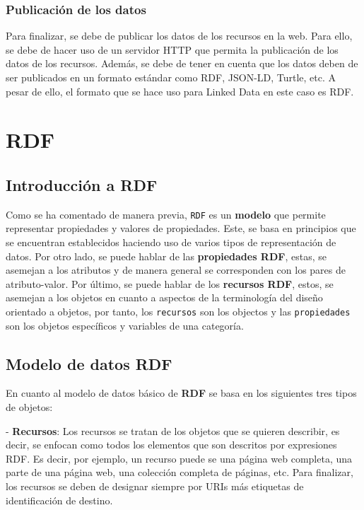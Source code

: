 \documentclass[11pt]{report}
\begin{document}
\subsection{Publicación de los datos}

Para finalizar, se debe de publicar los datos de los recursos en la web. Para ello, se debe de hacer uso de un servidor HTTP que permita la publicación de los datos de los recursos. Además, se debe de tener en cuenta que los datos deben de ser publicados en un formato estándar como RDF, JSON-LD, Turtle, etc. A pesar de ello, el formato que se hace uso para Linked Data en este caso es RDF.

\chapter{RDF}

\section{Introducción a RDF}

Como se ha comentado de manera previa, \texttt{RDF} es un \textbf{modelo} que permite representar propiedades y valores de propiedades. Este, se basa en principios que se encuentran establecidos haciendo uso de varios tipos de representación de datos. Por otro lado, se puede hablar de las \textbf{propiedades RDF}, estas, se asemejan a los atributos y de manera general se corresponden con los pares de atributo-valor. Por último, se puede hablar de los \textbf{recursos RDF}, estos, se asemejan a los objetos en cuanto a aspectos de la terminología del diseño orientado a objetos, por tanto, los \texttt{recursos} son los objectos y las \texttt{propiedades} son los objetos específicos y variables de una categoría.

\section{Modelo de datos RDF}

En cuanto al modelo de datos básico de \textbf{RDF} se basa en los siguientes tres tipos de objetos:

- \textbf{Recursos}: Los recursos se tratan de los objetos que se quieren describir, es decir, se enfocan como todos los elementos que son descritos por expresiones RDF. Es decir, por ejemplo, un recurso puede se una página web completa, una parte de una página web, una colección completa de páginas, etc. Para finalizar, los recursos se deben de designar siempre por URIs más etiquetas de identificación de destino.
\end{document}
